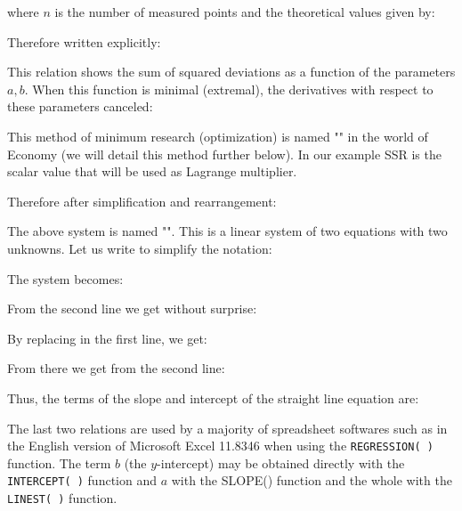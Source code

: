 	where $n$ is the number of measured points and the theoretical values given by:
	
	Therefore written explicitly:
	
	This relation shows the sum of squared deviations as a function of the parameters $a, b$. When this function is minimal (extremal), the derivatives with respect to these parameters canceled:
	
	
	\begin{tcolorbox}[title=Remark,colframe=black,arc=10pt]
This method of minimum research (optimization) is named "" in the world of Economy (we will detail this method further below). In our example SSR is the scalar value that will be used as Lagrange multiplier.
	\end{tcolorbox}	
	
	Therefore after simplification and rearrangement:
	
	The above system is named "". This is a linear system of two equations with two unknowns. Let us write to simplify the notation:
	
	The system becomes:
	
	From the second line we get without surprise:
	
	By replacing in the first line, we get:
	
	From there we get from the second line:
	
	Thus, the terms of the slope and intercept of the straight line equation are:
	
	The last two relations are used by a majority of spreadsheet softwares such as in the English version of Microsoft Excel 11.8346 when using the \texttt{REGRESSION( )} function. The term $b$ (the $y$-intercept) may be obtained directly with the \texttt{INTERCEPT( )} function and $a$ with the SLOPE() function and the whole with the \texttt{LINEST( )} function.
	
